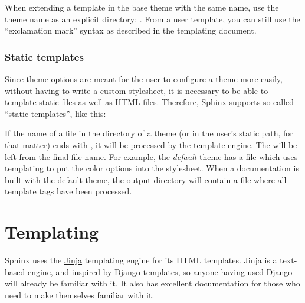 \documentclass[letterpaper,10pt,english]{sphinxmanual}
\begin{document}
When extending a template in the base theme with the same name, use the theme
name as an explicit directory: .  From a
user  template, you can still use the ``exclamation mark''
syntax as described in the templating document.


\subsection{Static templates}
\label{theming:static-templates}
Since theme options are meant for the user to configure a theme more easily,
without having to write a custom stylesheet, it is necessary to be able to
template static files as well as HTML files.  Therefore, Sphinx supports
so-called ``static templates'', like this:

If the name of a file in the  directory of a theme (or in the user's
static path, for that matter) ends with , it will be processed by the
template engine.  The  will be left from the final file name.  For
example, the \emph{default} theme has a file  which uses
templating to put the color options into the stylesheet.  When a documentation
is built with the default theme, the output directory will contain a
 file where all template tags have been processed.


\chapter{Templating}
\label{templating::doc}\label{templating:id1}\label{templating:templating}
Sphinx uses the \href{http://jinja.pocoo.org}{Jinja} templating engine for its HTML
templates.  Jinja is a text-based engine, and inspired by Django templates, so
anyone having used Django will already be familiar with it.  It also has
excellent documentation for those who need to make themselves familiar with it.
\end{document}

